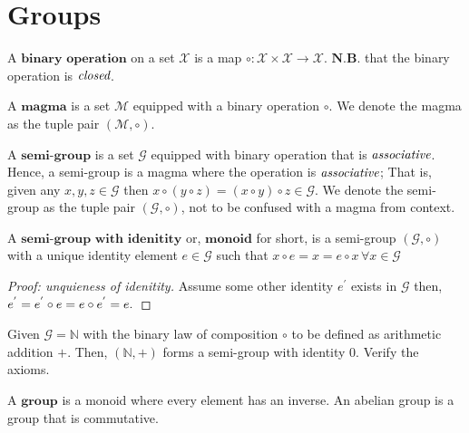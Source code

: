 
\section{Groups} %
\label{sec:groups}

\begin{defn}
 A $\textbf{binary operation}$ on a set $\mathcal{X}$ is a map
 $\circ : \mathcal{X} \times \mathcal{X} \to \mathcal{X}$.
 $\textbf{N.B.}$ that the binary operation is $\emph{closed}$.
\end{defn}

\begin{defn}[Magma]
 A $\textbf{magma}$ is a set $\mathcal{M}$ equipped with a binary operation $\circ$.
 We denote the magma as the tuple pair $(\mathcal{M}, \circ)$.
\end{defn}


\begin{defn}
 A $\textbf{semi-group}$ is a set $\mathcal{G}$ equipped with binary operation that is $\emph{associative}$.
 Hence, a semi-group is a magma where the operation is $\emph{associative}$;
 That is, given any $x,y,z \in \mathcal{G}$ then $x \circ (y \circ z) = (x \circ y) \circ z \in \mathcal{G}$.
 We denote the semi-group as the tuple pair $(\mathcal{G}, \circ)$, not to be confused with a magma from context.
\end{defn}

\begin{defn}[Monoid]
 A $\textbf{semi-group with idenitity}$ or, $\textbf{monoid}$ for short, is a semi-group $(\mathcal{G}, \circ)$
 with a unique identity element $e \in \mathcal{G}$ such that $x \circ e = x = e \circ x \, \forall x \in \mathcal{G}$
\end{defn}


\begin{proof}[Proof: unquieness of idenitity]
 Assume some other identity $e^{'}$ exists in $\mathcal{G}$ then, $e^{'} = e^{'} \circ e = e \circ e^{'} = e. \qedhere$
\end{proof}


\begin{exmp}
 Given $\mathcal{G} = \mathbb{N}$ with the binary law of composition $\circ$ to be defined as arithmetic addition $+$.
 Then, $(\mathbb{N}, +)$ forms a semi-group with identity $0$. Verify the axioms.
\end{exmp}


\begin{defn}[Group]
 A $\textbf{group}$ is a monoid where every element has an inverse. An abelian group is a group that is commutative.
\end{defn}

